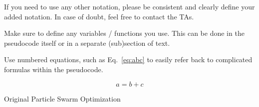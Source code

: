 \documentclass[runningheads]{llncs}
\begin{document}
If you need to use any other notation, please be consistent and clearly define your added notation. In case of doubt, feel free to contact the TAs. 

Make sure to define any variables / functions you use. This can be done in the pseudocode itself or in a separate (sub)section of text.

Use numbered equations, such as Eq.~\ref{eq:abc} to easily refer back to complicated formulas within the pseudocode. 

\begin{equation}\label{eq:abc}
    a = b + c
\end{equation}

\vspace{-4mm} 
\begin{algorithm}[!ht]
\begin{algorithmic}[1]
		  
	\EndFor
	
			\EndIf   
				 
			\EndIf  
			   
		\EndFor
	\EndWhile
 \end{algorithmic}
\caption{Original Particle Swarm Optimization}
\label{Alg:PSO}
\end{algorithm}
\vspace{-2mm}
\end{document}
